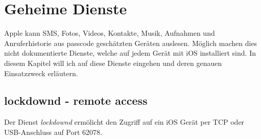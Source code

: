 \section{Geheime Dienste}
	Apple kann SMS, Fotos, Videos, Kontakte, Musik, Aufnahmen und Anruferhistorie
	aus passcode geschätzten Geräten auslesen. Möglich machen dies nicht
	dokumentierte Dienste, welche auf jedem Gerät mit iOS installiert sind. In
	diesem Kapitel will ich auf diese Dienste eingehen und deren genauen
	Einsatzzweck erläutern.
	\subsection{lockdownd - remote access}
	Der Dienst \textsl{lockdownd} ermölicht den Zugriff auf ein iOS Gerät
	per TCP oder USB-Anschluss auf Port 62078.